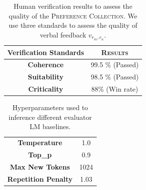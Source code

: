 \documentclass[11pt]{article}
\begin{document}









\clearpage
\appendix



\begin{table}[t!]
\centering
\fontsize{8}{10}\selectfont
\begin{tabular}{cc}
\toprule
Verification Standards & \textsc{Results} \\ \midrule
\textbf{Coherence} & 99.5 \% (Passed)\\
\textbf{Suitability} &  98.5 \% (Passed)\\
\textbf{Criticality} & 88\% (Win rate) \\ 
\bottomrule
\end{tabular}%
\caption{\footnotesize Human verification results to assess the quality of the \textsc{Preference Collection}. We use three standards to assess the quality of verbal feedback ${v}_{{r}_{m},{r}_{n}}$.}
\label{tab:quality}
\end{table}

\begin{table}[t!]
\centering
\fontsize{8}{10}\selectfont
\begin{tabular}{c|c}
\toprule
\textbf{Temperature} & 1.0\\
\textbf{Top\_p} &  0.9\\
\textbf{Max New Tokens} & 1024 \\ 
\textbf{Repetition Penalty} & 1.03 \\ 
\bottomrule
\end{tabular}%
\caption{\footnotesize Hyperparameters used to inference different evaluator LM baselines.}
\label{tab:inference_hyperparameter}
\end{table}
\end{document}
